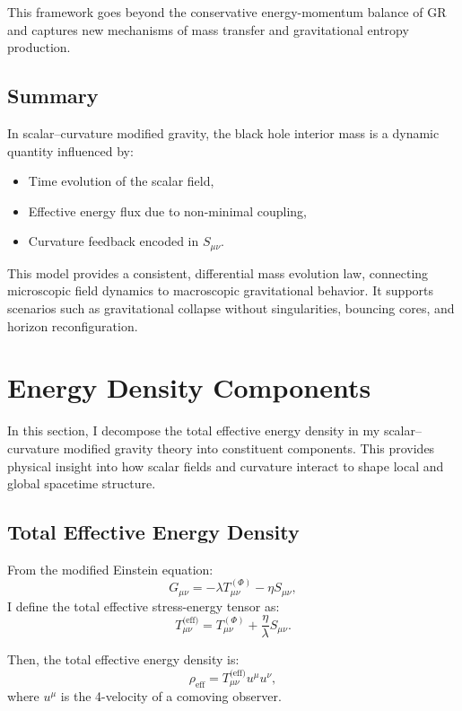\documentclass[12pt]{article}
\begin{document}
This framework goes beyond the conservative energy-momentum balance of GR and captures new mechanisms of mass transfer and gravitational entropy production.

\subsection{Summary}

In scalar--curvature modified gravity, the black hole interior mass is a dynamic quantity influenced by:
\begin{itemize}
    \item Time evolution of the scalar field,
    \item Effective energy flux due to non-minimal coupling,
    \item Curvature feedback encoded in \( S_{\mu\nu} \).
\end{itemize}

This model provides a consistent, differential mass evolution law, connecting microscopic field dynamics to macroscopic gravitational behavior. It supports scenarios such as gravitational collapse without singularities, bouncing cores, and horizon reconfiguration.

\section{Energy Density Components}

In this section, I decompose the total effective energy density in my scalar--curvature modified gravity theory into constituent components. This provides physical insight into how scalar fields and curvature interact to shape local and global spacetime structure.

\subsection{Total Effective Energy Density}

From the modified Einstein equation:
\begin{equation}
G_{\mu\nu} = -\lambda T^{(\Phi)}_{\mu\nu} - \eta S_{\mu\nu},
\end{equation}
I define the total effective stress-energy tensor as:
\begin{equation}
T^{\text{(eff)}}_{\mu\nu} = T^{(\Phi)}_{\mu\nu} + \frac{\eta}{\lambda} S_{\mu\nu}.
\end{equation}

Then, the total effective energy density is:
\begin{equation}
\rho_{\text{eff}} = T^{\text{(eff)}}_{\mu\nu} u^\mu u^\nu,
\end{equation}
where \( u^\mu \) is the 4-velocity of a comoving observer.
\end{document}
